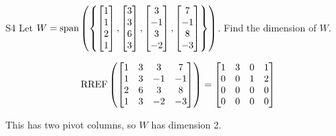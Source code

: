 \documentclass{sbgLAexam}
\begin{document}
\begin{problem}{S4}
Let $W = {\rm span} \left( \left\{ \begin{bmatrix} 1 \\ 1 \\ 2 \\ 1 \end{bmatrix}, \begin{bmatrix} 3 \\ 3 \\ 6 \\ 3 \end{bmatrix}, \begin{bmatrix} 3 \\ -1 \\ 3 \\ -2 \end{bmatrix}, \begin{bmatrix} 7 \\ -1 \\ 8 \\ -3 \end{bmatrix} \right\} \right)$.  Find the dimension of $W$.
\end{problem}
\begin{solution}
$$\operatorname{RREF}\left(\begin{bmatrix} 1 & 3 & 3 & 7 \\ 1 & 3 & -1 & -1 \\ 2 & 6 & 3 & 8 \\ 1 & 3 & -2 & -3 \end{bmatrix}\right) = \begin{bmatrix} 1 & 3 & 0 & 1 \\ 0 & 0 & 1 & 2 \\ 0 & 0 & 0 & 0 \\  0 & 0 & 0 & 0 \end{bmatrix}$$

This has two pivot columns, so $W$ has dimension 2.
\end{solution}
\end{document}
